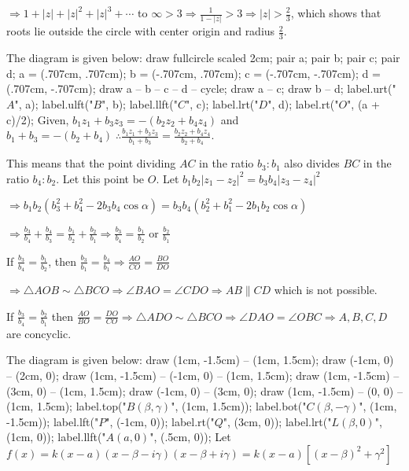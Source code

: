   $\Rightarrow 1 + |z| + |z|^2 + |z|^3 + \cdots $ to $\infty > 3 \Rightarrow \frac{1}{1 - |z|} > 3
  \Rightarrow |z| > \frac{2}{3}$, which shows that roots lie outside the circle with center origin and
  radius $\frac{2}{3}$.
\item The diagram is given below:
  \startplacefigure[location={left, none}]
    \startMPcode
      draw fullcircle scaled 2cm;
      pair a; pair b; pair c; pair d;
      a = (.707cm, .707cm); b = (-.707cm, .707cm); c = (-.707cm, -.707cm); d = (.707cm, -.707cm);
      draw a -- b -- c -- d -- cycle;
      draw a -- c; draw b -- d;
      label.urt("$A$", a);
      label.ulft("$B$", b);
      label.llft("$C$", c);
      label.lrt("$D$", d);
      label.rt("$O$", (a + c)/2);
    \stopMPcode
  \stopplacefigure
  Given, $b_1z_1 + b_3z_3 = -(b_2z_2 + b_4z_4)$ and $b_1 + b_3 = -(b_2 + b_4)\;\therefore \frac{b_1z_1 +
    b_3z_3}{b_1 + b_3} = \frac{b_2z_2 + b_4z_4}{b_2 + b_4}$.

  This means that the point dividing $AC$ in the ratio $b_3:b_1$ also divides $BC$ in the ratio
  $b_4:b_2$. Let this point be $O$. Let $b_1b_2|z_1 - z_2|^2 = b_3b_4|z_3 - z_4|^2$

  $\Rightarrow b_1b_2(b_3^2 + b_4^2 - 2b_3b_4\cos\alpha) = b_3b_4(b_2^2 + b_1^2 - 2b_1b_2\cos\alpha)$

  $\Rightarrow \frac{b_3}{b_4} + \frac{b_4}{b_3} = \frac{b_1}{b_2} + \frac{b_2}{b_1}\Rightarrow
  \frac{b_3}{b_4} = \frac{b_1}{b_2}$ or $\frac{b_2}{b_1}$

  If $\frac{b_3}{b_4} = \frac{b_1}{b_2}$, then $\frac{b_3}{b_1} = \frac{b_4}{b_1} \Rightarrow \frac{AO}{CO}
  = \frac{BO}{DO}$

  $\Rightarrow \triangle AOB\sim\triangle BCO \Rightarrow \angle BAO = \angle CDO \Rightarrow AB\parallel
  CD$ which is not possible.

  If $\frac{b_3}{b_4} = \frac{b_2}{b_1}$ then $\frac{AO}{BO} = \frac{DO}{CO}\Rightarrow \triangle
  ADO\sim\triangle BCO\Rightarrow \angle DAO = \angle OBC\Rightarrow A, B, C, D$ are concyclic.
\item The diagram is given below:
  \startplacefigure[location={left, none}]
    \startMPcode
      draw (1cm, -1.5cm) -- (1cm, 1.5cm);
      draw (-1cm, 0) -- (2cm, 0);
      draw (1cm, -1.5cm) -- (-1cm, 0) -- (1cm, 1.5cm);
      draw (1cm, -1.5cm) -- (3cm, 0) -- (1cm, 1.5cm);
      draw (-1cm, 0) -- (3cm, 0);
      draw (1cm, -1.5cm) -- (0, 0) -- (1cm, 1.5cm);
      label.top("$B(\beta, \gamma)$", (1cm, 1.5cm));
      label.bot("$C(\beta, -\gamma)$", (1cm, -1.5cm));
      label.lft("$P$", (-1cm, 0));
      label.rt("$Q$", (3cm, 0));
      label.lrt("$L(\beta, 0)$", (1cm, 0));
      label.llft("$A(a, 0)$", (.5cm, 0));
    \stopMPcode
  \stopplacefigure
  Let $f(x) = k(x - a)(x - \beta - i\gamma)(x - \beta + i\gamma) = k(x - a)[(x - \beta)^2 + \gamma^2]$

